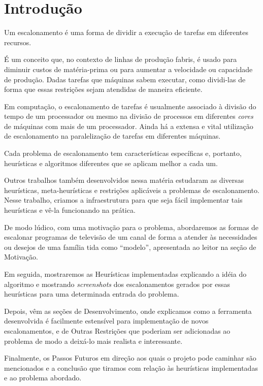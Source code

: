 \section{Introdução}

Um escalonamento é uma forma de dividir a execução de tarefas em diferentes recursos. 

É um conceito que, no contexto de linhas de produção fabris, é usado para diminuir custos de matéria-prima ou para aumentar a velocidade ou capacidade de produção. Dadas tarefas que máquinas sabem executar, como dividi-las de forma que essas restrições sejam atendidas de maneira eficiente.

Em computação, o escalonamento de tarefas é usualmente associado à divisão do tempo de um processador ou mesmo na divisão de processos em diferentes \textit{cores} de máquinas com mais de um processador. Ainda há a extensa e vital utilização de escalonamento na paralelização de tarefas em diferentes máquinas.

Cada problema de escalonamento tem características específicas e, portanto, heurísticas e algoritmos diferentes que se aplicam melhor a cada um.

Outros trabalhos também desenvolvidos nessa matéria estudaram as diversas heurísticas, meta-heurísticas e restrições aplicáveis a problemas de escalonamento. Nesse trabalho, criamos a infraestrutura para que seja fácil implementar tais heurísticas e vê-la funcionando na prática.

De modo lúdico, com uma motivação para o problema, abordaremos as formas de escalonar programas de televisão de um canal de forma a atender às necessidades ou desejos de uma família tida como ``modelo'', apresentada ao leitor na seção de Motivação.

Em seguida, mostraremos as Heurísticas implementadas explicando a idéia do algoritmo e mostrando \textit{screenshots} dos escalonamentos gerados por essas heurísticas para uma determinada entrada do problema.

Depois, vêm as seções de Desenvolvimento, onde explicamos como a ferramenta desenvolvida é facilmente estensível para implementação de novos escalonamentos, e de Outras Restrições que poderiam ser adicionadas ao problema de modo a deixá-lo mais realista e interessante.

Finalmente, os Passos Futuros em direção aos quais o projeto pode caminhar são mencionados e a conclusão que tiramos com relação às heurísticas implementadas e ao problema abordado.
